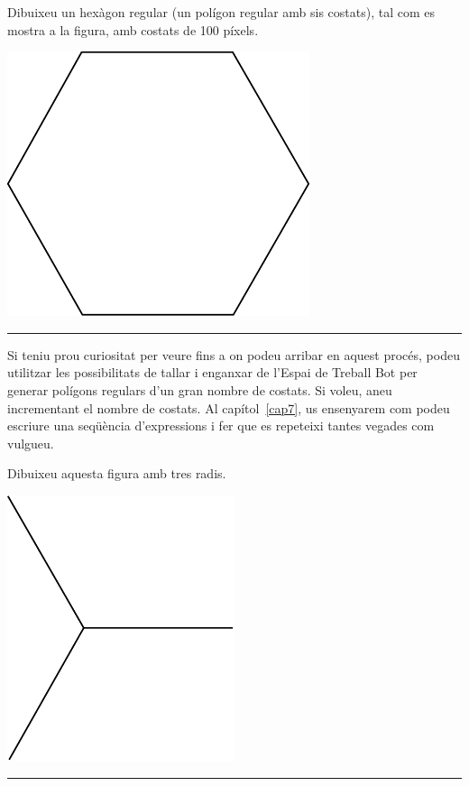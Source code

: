\begin{center}
\colorbox{black}{}
\end{center}
{\small
\noindent
Dibuixeu un hexàgon regular (un polígon regular amb sis costats), tal com es mostra a la figura, amb costats de 100 píxels.}
\begin{center}
\includegraphics[scale=0.8]{Imatges/figuraE4-10.pdf} 
\end{center}
\noindent
\rule{\textwidth}{3pt}
\newline

Si teniu prou curiositat per veure fins a on podeu arribar en aquest procés, podeu utilitzar les possibilitats de tallar i enganxar de l'\textsf{Espai de Treball Bot} per generar polígons regulars d'un gran nombre de costats. Si voleu, aneu incrementant el nombre de costats. Al capítol~\ref{cap7}, 
us ensenyarem com podeu escriure una seqüència d'expressions i fer que es repeteixi tantes vegades com vulgueu.   

\begin{center}
\colorbox{black}{}
\end{center}
{\small
\noindent
Dibuixeu aquesta figura amb tres radis.}
\begin{center}
\includegraphics[scale=0.75]{Imatges/figuraE4-11.pdf} 
\end{center}
\noindent
\rule{\textwidth}{3pt}

